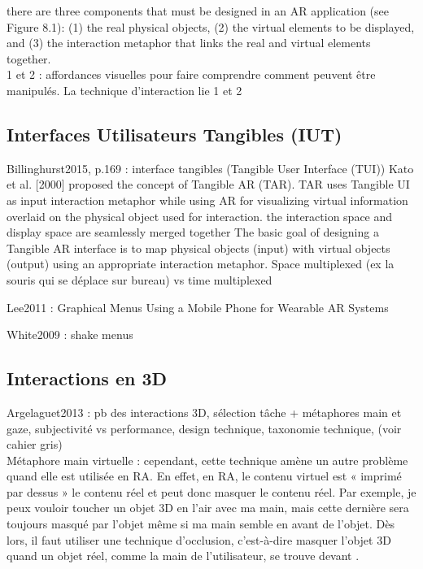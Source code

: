 there are three components that must be designed in an AR application (see Figure 8.1): (1) the real physical objects, (2) the virtual elements to be displayed, and (3) the interaction metaphor that links the real and virtual elements together.\\
1 et 2 : affordances visuelles pour faire comprendre comment peuvent être manipulés. La technique d'interaction lie 1 et 2

\subsection{Interfaces Utilisateurs Tangibles (IUT)}
Billinghurst2015, p.169 : interface tangibles (Tangible User Interface (TUI))
Kato et al. [2000] proposed the concept of Tangible AR (TAR). TAR uses Tangible UI as input interaction metaphor while using AR for visualizing virtual information overlaid on the physical object used for interaction. the interaction space and display space are seamlessly merged together
The basic goal of designing a Tangible AR interface is to map physical objects (input) with virtual objects (output) using an appropriate interaction metaphor.
Space multiplexed (ex la souris qui se déplace sur bureau) vs time multiplexed

Lee2011 : Graphical Menus Using a Mobile Phone for Wearable AR Systems

White2009 : shake menus

\subsection{Interactions en 3D}
Argelaguet2013 : pb des interactions 3D, sélection tâche + métaphores main et gaze, subjectivité vs performance, design technique, taxonomie technique,  (voir cahier gris)\\
Métaphore main virtuelle : cependant, cette technique amène un autre problème quand elle est utilisée en RA. En effet, en RA, le contenu virtuel est « imprimé par dessus » le contenu réel et peut donc masquer le contenu réel. Par exemple, je peux vouloir toucher un objet 3D en l'air avec ma main, mais cette dernière sera toujours masqué par l'objet même si ma main semble en avant de l'objet. Dès lors, il faut utiliser une technique d'occlusion, c'est-à-dire masquer l'objet 3D quand un objet réel, comme la main de l'utilisateur, se trouve devant .


